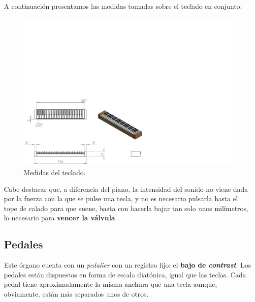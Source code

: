 \smallskip

A continuación presentamos las medidas tomadas sobre el teclado en conjunto:

\smallskip

\begin{figure}[H]
	\noindent \begin{centering}
		\includegraphics[width=\linewidth]{capitulo3/teclado_modelo}
		\par\end{centering}
	\smallskip
	\caption{\label{fig:teclado_modelo} Medidas del teclado.}
\end{figure} 

\smallskip

Cabe destacar que, a diferencia del piano, la intensidad del sonido no viene dada por la fuerza con la que se pulse una tecla, y no es necesario pulsarla hasta el tope de calado para que suene, basta con hacerla bajar tan solo unos milímetros, lo necesario para \textbf{vencer la válvula}.

\subsection{Pedales}

Este órgano cuenta con un \textit{pedalier} con un registro fijo: el \textbf{bajo de \textit{contrast}}. Los pedales están dispuestos en forma de escala diatónica, igual que las teclas. Cada pedal tiene aproximadamente la misma anchura que una tecla aunque, obviamente, están más separados unos de otros.

\smallskip

